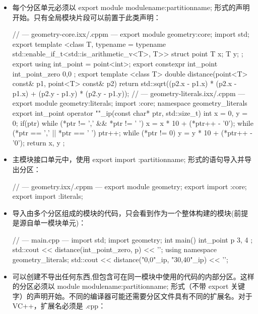 \begin{itemize}
\item
每个分区单元必须以 export module modulename:partitionname; 形式的声明开始。只有全局模块片段可以前置于此类声明：

\begin{cpp}
// --- geometry-core.ixx/.cppm ---
export module geometry:core;
import std;
export template <class T,
    typename = typename std::enable_if_t<std::is_arithmetic_v<T>, T>>
struct point
{
    T x;
    T y;
};
export using int_point = point<int>;
export constexpr int_point int_point_zero{ 0,0 };
export template <class T>
double distance(point<T> const& p1, point<T> const& p2)
{
    return std::sqrt((p2.x - p1.x) * (p2.x - p1.x) +
                     (p2.y - p1.y) * (p2.y - p1.y));
}
// --- geometry-literals.ixx/.cppm ---
export module geometry:literals;
import :core;
namespace geometry_literals
{
    export int_point operator ""_ip(const char* ptr, std::size_t)
    {
        int x = 0, y = 0;
        if(ptr)
        {
            while (*ptr != ',' && *ptr != ' ')
                x = x * 10 + (*ptr++ - '0');
            while (*ptr == ',' || *ptr == ' ') ptr++;
            while (*ptr != 0)
                y = y * 10 + (*ptr++ - '0');
        }
        return { x, y };
    }
}
\end{cpp}

\item
主模块接口单元中，使用 export import :partitionname; 形式的语句导入并导出分区：

\begin{cpp}
// --- geometry.ixx/.cppm ---
export module geometry;
export import :core;
export import :literals;
\end{cpp}

\item
导入由多个分区组成的模块的代码，只会看到作为一个整体构建的模块(前提是源自单一模块单元)：

\begin{cpp}
// --- main.cpp ---
import std;
import geometry;
int main()
{
    int_point p{ 3, 4 };
    std::cout << distance(int_point_zero, p) << '\n';
    {
        using namespace geometry_literals;
        std::cout << distance("0,0"_ip, "30,40"_ip) << '\n';
    }
}
\end{cpp}

\item
可以创建不导出任何东西,但包含可在同一模块中使用的代码的内部分区。这样的分区必须以 module modulename:partitionname; 形式（不带 export 关键字）的声明开始。不同的编译器可能还需要分区文件具有不同的扩展名。对于 VC++，扩展名必须是 .cpp：


\end{itemize}
